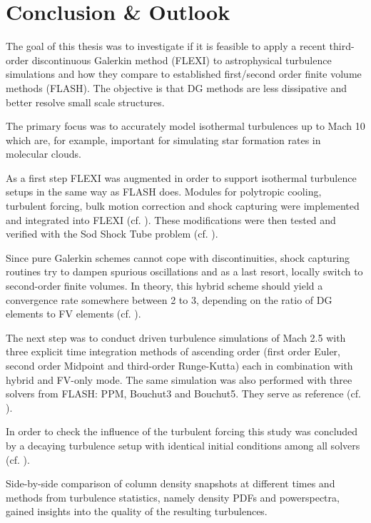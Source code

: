 \section{Conclusion \& Outlook}
The goal of this thesis was to investigate if it is feasible to apply a
recent third-order discontinuous Galerkin method (FLEXI) to astrophysical
turbulence simulations and how they compare to established first/second order
finite volume methods (FLASH). The objective is that DG methods are less
dissipative and better resolve small scale structures.

The primary focus was to accurately model isothermal turbulences up to Mach 10
which are, for example, important for simulating star formation rates in
molecular clouds.

As a first step FLEXI was augmented in order to support isothermal turbulence
setups in the same way as FLASH does. Modules for polytropic cooling, turbulent
forcing, bulk motion correction and shock capturing were implemented and
integrated into FLEXI (cf. ). These
modifications were then tested and verified with the Sod Shock Tube problem
(cf. ).

Since pure Galerkin schemes cannot cope with discontinuities, shock
capturing routines try to dampen spurious oscillations and as a last resort,
locally switch to second-order finite volumes. In theory, this hybrid scheme
should yield a convergence rate somewhere between 2 to 3, depending on the
ratio of DG elements to FV elements (cf. ).

The next step was to conduct driven turbulence simulations of Mach 2.5 with
three explicit time integration methods of ascending order (first order Euler,
second order Midpoint and third-order Runge-Kutta) each in combination with
hybrid and FV-only mode. The same simulation was also performed with three
solvers from FLASH: PPM, Bouchut3 and Bouchut5. They serve as reference
(cf. ).

In order to check the influence of the turbulent forcing this study was
concluded by a decaying turbulence setup with identical initial conditions
among all solvers (cf. ).

Side-by-side comparison of column density snapshots at different times and
methods from turbulence statistics, namely density PDFs and powerspectra,
gained insights into the quality of the resulting turbulences.


